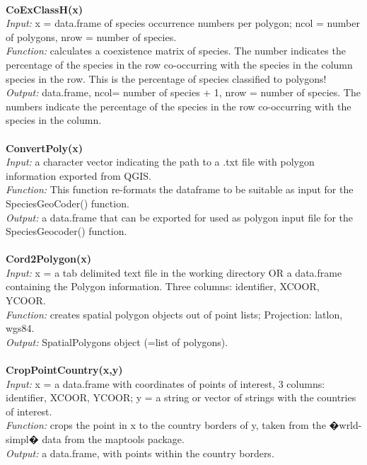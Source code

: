 \documentclass[a4paper,titlepage,11pt]{scrreprt}
\begin{document}
\\
\textbf{CoExClassH(x)}\\
\textit{Input:} x = data.frame of species occurrence numbers per polygon; ncol = number of polygons, nrow = number of species.\\
\textit{Function:} calculates a coexistence matrix of species. The number indicates the percentage of the species in the row co-occurring with the species in the column species in the row. This is the percentage of species classified to polygons!\\
\textit{Output:} data.frame, ncol= number of species + 1, nrow = number of species. The numbers indicate the percentage of the species in the row co-occurring with the species in the column.\\
\\
\textbf{ConvertPoly(x)}\\
\textit{Input:} a character vector indicating the path to a .txt file with polygon information exported from QGIS.\\
\textit{Function:} This function re-formats the dataframe to be suitable as input for the SpeciesGeoCoder() function.\\
\textit{Output:} a data.frame that can be exported for used as polygon input file for the SpeciesGeocoder() function.\\
\\
\textbf{Cord2Polygon(x)}\\
\textit{Input:} x = a tab delimited text file in the working directory OR a data.frame containing the Polygon information. Three columns: identifier, XCOOR, YCOOR.\\
\textit{Function:} creates spatial polygon objects out of point lists; Projection: latlon, wgs84.\\
\textit{Output:} SpatialPolygons object (=list of polygons).\\
\\
\textbf{CropPointCountry(x,y)}\\
\textit{Input:} x = a data.frame with coordinates of points of interest, 3 columns: identifier, XCOOR, YCOOR; y = a string or vector of strings with the countries of interest.\\
\textit{Function:} crops the point in x to the country borders of y, taken from the �wrld-simpl� data from the maptools package.\\
\textit{Output:} a data.frame, with points within the country borders.\\
\\
\end{document}
